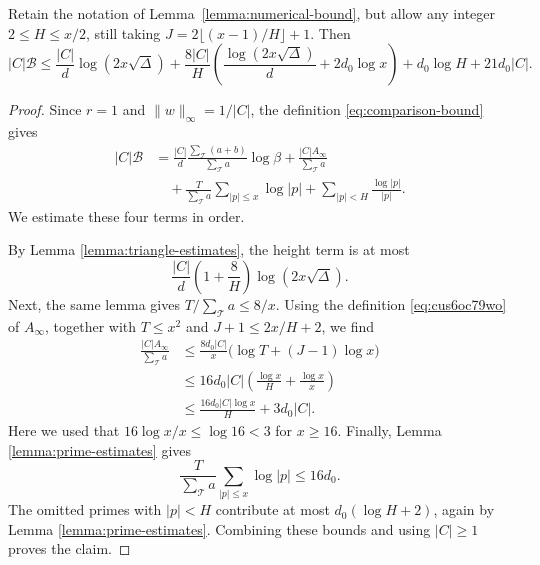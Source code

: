 \documentclass[reqno]{amsart} 
\begin{document}
\begin{proposition}\label{proposition:variable-parameters}
  Retain the notation of Lemma~\ref{lemma:numerical-bound}, but allow any integer $2 \leq H \leq x/2$, still taking $J=2\lfloor(x-1)/H\rfloor+1$.  Then
  \begin{equation*}
    |C|\mathcal{B}
    \leq \frac{|C|}{d}\log(2x\sqrt{\Delta})
    + \frac{8|C|}{H}\left(\frac{\log(2x\sqrt{\Delta})}{d} + 2d_0\log x\right)
    + d_0\log H + 21d_0|C|.
  \end{equation*}
\end{proposition}
\begin{proof}
  Since $r=1$ and $\lVert w\rVert_\infty=1/|C|$, the definition \eqref{eq:comparison-bound} gives
  \begin{equation}\label{eq:height-prime-comparison}
    \begin{split}
      |C|\mathcal{B}
      &= \frac{|C|}{d}\frac{\sum_{\mathcal{T}}(a+b)}{\sum_{\mathcal{T}}a}\log\beta
      + \frac{|C|A_\infty}{\sum_{\mathcal{T}}a} \\
      &\quad + \frac{T}{\sum_{\mathcal{T}}a}\sum_{|p|\leq x}\log|p|
      + \sum_{|p|<H}\frac{\log|p|}{|p|}.
    \end{split}
  \end{equation}
  We estimate these four terms in order.

  By Lemma \ref{lemma:triangle-estimates}, the height term is at most
  \begin{equation*}
    \frac{|C|}{d}\left(1 + \frac{8}{H}\right)\log(2x\sqrt{\Delta}).
  \end{equation*}
  Next, the same lemma gives $T/\sum_{\mathcal{T}} a \leq 8/x$.  Using the definition \eqref{eq:cus6oc79wo} of $A_\infty$, together with $T \leq x^2$ and $J + 1 \leq 2x/H + 2$, we find
  \begin{equation*}
    \begin{split}
      \frac{|C| A_\infty}{\sum_{\mathcal{T}} a}
      &\leq \frac{8d_0|C|}{x}\bigl(\log T + (J - 1)\log x\bigr) \\
      &\leq 16d_0|C|\left(\frac{\log x}{H} + \frac{\log x}{x}\right) \\
      &\leq \frac{16d_0|C|\log x}{H} + 3d_0|C|.
    \end{split}
  \end{equation*}
  Here we used that $16\log x/x \leq \log 16 < 3$ for $x \geq 16$.  Finally, Lemma \ref{lemma:prime-estimates} gives
  \begin{equation*}
    \frac{T}{\sum_{\mathcal{T}} a}\sum_{|p| \leq x}\log |p|
    \leq 16d_0.
  \end{equation*}
  The omitted primes with $|p| < H$ contribute at most $d_0(\log H + 2)$, again by Lemma \ref{lemma:prime-estimates}.  Combining these bounds and using $|C| \geq 1$ proves the claim.
\end{proof}
\end{document}
